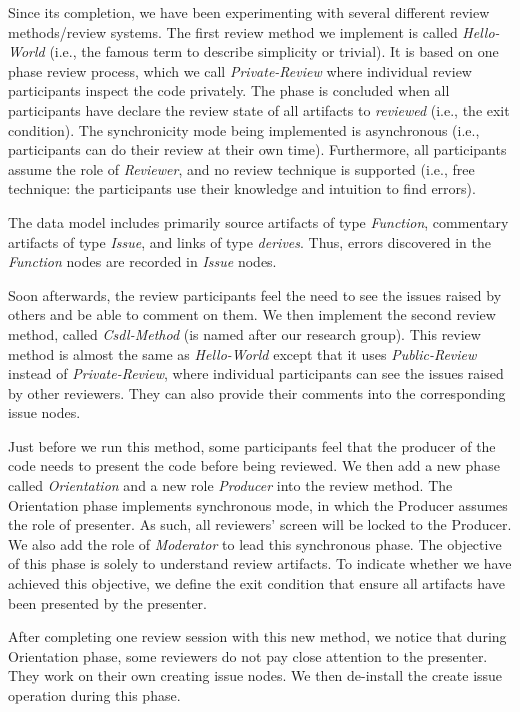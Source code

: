 Since its completion, we have been experimenting with several different
review methods/review systems. The first review method we implement
is called {\it Hello-World} (i.e., the famous term to 
describe simplicity or trivial). It is based on
one phase review process, which we call {\it Private-Review}
where individual review participants inspect the code privately. The
phase is concluded when all participants have declare the review state
of all artifacts to {\it reviewed} (i.e., the exit condition). The
synchronicity mode being implemented is asynchronous (i.e.,
participants can do their 
review at their own time). Furthermore, all participants assume the
role of {\it Reviewer}, and no review technique is supported (i.e.,
free technique: the participants use their knowledge and intuition to
find errors). 

The data model includes primarily
source artifacts of type {\it Function}, commentary artifacts of
type {\it Issue}, and links of type {\it derives}.
Thus, errors discovered in the {\it Function} nodes are recorded in
{\it Issue} nodes. 

Soon afterwards, the review participants feel the need to see 
the issues raised by others and be able to comment on them. We then
implement the 
second review method, called {\it Csdl-Method} (is named after our
research group). This review method is almost the same as {\it
Hello-World} except that it uses {\it Public-Review} instead of {\it
Private-Review}, where
individual participants can see the issues raised by other
reviewers. They can also provide their comments into the corresponding 
issue nodes. 

Just before we run this method, some participants feel that the
producer of the code needs to present the code before being reviewed. 
We then add a new phase called {\it Orientation} and a new role  
{\it Producer} into the review method.
The Orientation phase implements synchronous
mode, in which the Producer assumes the role of presenter. As such, all
reviewers' screen will be locked to the Producer. We also add the role
of {\it Moderator} to lead this synchronous phase.
The objective of this phase is solely to understand review
artifacts. To indicate whether we have achieved this objective,
we define the exit condition that ensure all artifacts have been 
presented by the presenter.

After completing one review session with this new method, we notice
that during Orientation 
phase, some reviewers do not pay close attention to the
presenter. They work on their own creating issue nodes.
We then de-install the create issue operation during this phase.

